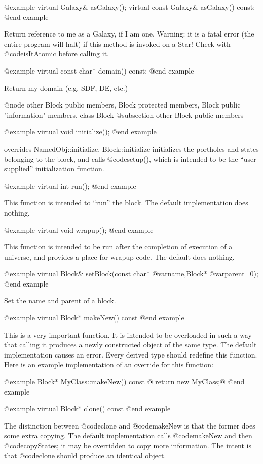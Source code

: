 @example
virtual Galaxy& asGalaxy();
virtual const Galaxy& asGalaxy() const;
@end example

Return reference to me as a Galaxy, if I am one.  Warning: it is a
fatal error (the entire program will halt) if this method is invoked
on a Star!  Check with @code{isItAtomic} before calling it.

@example
virtual const char* domain() const;
@end example

Return my domain (e.g. SDF, DE, etc.)

@node other Block public members, Block protected members, Block public "information" members, class Block
@subsection other Block public members

@example
virtual void initialize();
@end example

overrides NamedObj::initialize.  Block::initialize initializes the
portholes and states belonging to the block, and calls @code{setup()}, which
is intended to be the ``user-supplied'' initialization function.

@example
virtual int run();
@end example

This function is intended to ``run'' the block.  The default
implementation does nothing.

@example
virtual void wrapup();
@end example

This function is intended to be run after the completion of execution
of a universe, and provides a place for wrapup code.  The default does
nothing.

@example
virtual Block& setBlock(const char* @var{name},Block* @var{parent}=0);
@end example

Set the name and parent of a block.

@example
virtual Block* makeNew() const
@end example

This is a very important function.  It is intended to be overloaded in
such a way that calling it produces a newly constructed object of the
same type.  The default implementation causes an error.  Every derived
type should redefine this function.  Here is an example implementation
of an override for this function:

@example
Block* MyClass::makeNew() const @{ return new MyClass;@}
@end example

@example
virtual Block* clone() const
@end example

The distinction between @code{clone} and @code{makeNew} is that the
former does some extra copying.  The default implementation calls
@code{makeNew} and then @code{copyStates}; it may be overridden to
copy more information.  The intent is that @code{clone} should produce
an identical object.

